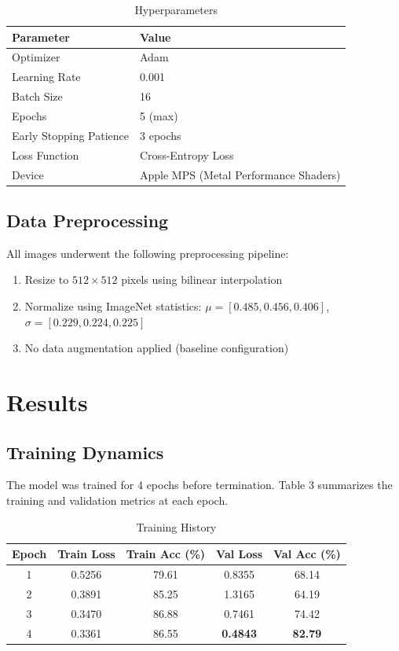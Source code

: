\documentclass[11pt,a4paper]{article}
\begin{document}
\begin{table}[H]
\centering
\caption{Hyperparameters}
\begin{tabular}{ll}
\toprule
\textbf{Parameter} & \textbf{Value} \\
\midrule
Optimizer & Adam \\
Learning Rate & 0.001 \\
Batch Size & 16 \\
Epochs & 5 (max) \\
Early Stopping Patience & 3 epochs \\
Loss Function & Cross-Entropy Loss \\
Device & Apple MPS (Metal Performance Shaders) \\
\bottomrule
\end{tabular}
\end{table}

\subsection{Data Preprocessing}

All images underwent the following preprocessing pipeline:
\begin{enumerate}
    \item Resize to $512 \times 512$ pixels using bilinear interpolation
    \item Normalize using ImageNet statistics: $\mu = [0.485, 0.456, 0.406]$, $\sigma = [0.229, 0.224, 0.225]$
    \item No data augmentation applied (baseline configuration)
\end{enumerate}

\section{Results}

\subsection{Training Dynamics}

The model was trained for 4 epochs before termination. Table 3 summarizes the training and validation metrics at each epoch.

\begin{table}[H]
\centering
\caption{Training History}
\begin{tabular}{ccccc}
\toprule
\textbf{Epoch} & \textbf{Train Loss} & \textbf{Train Acc (\%)} & \textbf{Val Loss} & \textbf{Val Acc (\%)} \\
\midrule
1 & 0.5256 & 79.61 & 0.8355 & 68.14 \\
2 & 0.3891 & 85.25 & 1.3165 & 64.19 \\
3 & 0.3470 & 86.88 & 0.7461 & 74.42 \\
4 & 0.3361 & 86.55 & \textbf{0.4843} & \textbf{82.79} \\
\bottomrule
\end{tabular}
\end{table}
\end{document}
